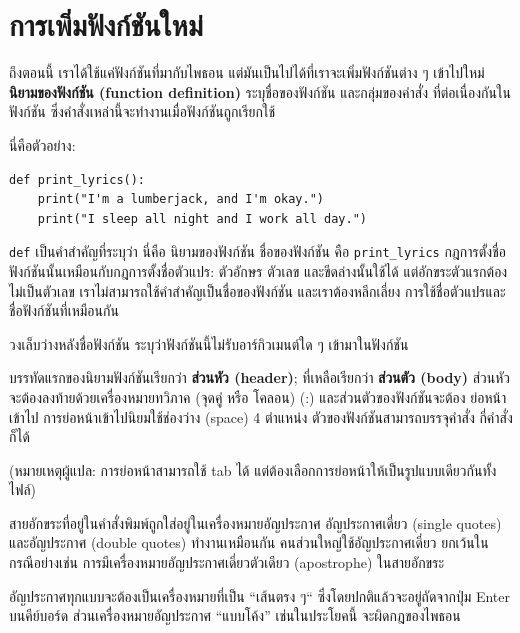 \section{การเพิ่มฟังก์ชันใหม่} %

ถึงตอนนี้ เราได้ใช้แค่ฟังก์ชันที่มากับไพธอน แต่มันเป็นไปได้ที่เราจะเพิ่มฟังก์ชันต่าง ๆ เข้าไปใหม่
{\bf นิยามของฟังก์ชัน (function definition)} ระบุชื่อของฟังก์ชัน และกลุ่มของคำสั่ง
ที่ต่อเนื่องกันในฟังก์ชัน ซึ่งคำสั่งเหล่านี้จะทำงานเมื่อฟังก์ชันถูกเรียกใช้

นี่คือตัวอย่าง:

\begin{verbatim}
def print_lyrics():
    print("I'm a lumberjack, and I'm okay.")
    print("I sleep all night and I work all day.")
\end{verbatim}
%
{\tt def} เป็นคำสำคัญที่ระบุว่า นี่คือ นิยามของฟังก์ชัน  ชื่อของฟังก์ชัน คือ \verb|print_lyrics|
กฎการตั้งชื่อฟังก์ชันนั้นเหมือนกับกฎการตั้งชื่อตัวแปร: ตัวอักษร ตัวเลข และขีดล่างนั้นใช้ได้ 
แต่อักขระตัวแรกต้องไม่เป็นตัวเลข เราไม่สามารถใช้คำสำคัญเป็นชื่อของฟังก์ชัน และเราต้องหลีกเลี่ยง
การใช้ชื่อตัวแปรและชื่อฟังก์ชันที่เหมือนกัน

วงเล็บว่างหลังชื่อฟังก์ชัน ระบุว่าฟังก์ชันนี้ไม่รับอาร์กิวเมนต์ใด ๆ เข้ามาในฟังก์ชัน
 


บรรทัดแรกของนิยามฟังก์ชันเรียกว่า {\bf ส่วนหัว (header)}; ที่เหลือเรียกว่า {\bf ส่วนตัว (body)}
ส่วนหัวจะต้องลงท้ายด้วยเครื่องหมายทวิภาค (จุดคู่ หรือ โคลอน) (:) และส่วนตัวของฟังก์ชันจะต้อง
ย่อหน้าเข้าไป การย่อหน้าเข้าไปนิยมใช้ช่องว่าง (space) 4 ตำแหน่ง ตัวของฟังก์ชันสามารถบรรจุคำสั่ง
กี่คำสั่งก็ได้

(หมายเหตุผู้แปล: การย่อหน้าสามารถใช้ tab ได้ แต่ต้องเลือกการย่อหน้าให้เป็นรูปแบบเดียวกันทั้งไฟล์)

สายอักขระที่อยู่ในคำสั่งพิมพ์ถูกใส่อยู่ในเครื่องหมายอัญประกาศ  อัญประกาศเดี่ยว (single quotes) 
และอัญประกาศ (double quotes) ทำงานเหมือนกัน คนส่วนใหญ่ใช้อัญประกาศเดี่ยว 
ยกเว้นในกรณีอย่างเช่น การมีเครื่องหมายอัญประกาศเดี่ยวตัวเดียว (apostrophe) ในสายอักขระ

อัญประกาศทุกแบบจะต้องเป็นเครื่องหมายที่เป็น ``เส้นตรง ๆ`` ซึ่งโดยปกติแล้วจะอยู่ถัดจากปุ่ม Enter 
บนคีย์บอร์ด ส่วนเครื่องหมายอัญประกาศ ``แบบโค้ง'' เช่นในประโยคนี้ จะผิดกฎของไพธอน

